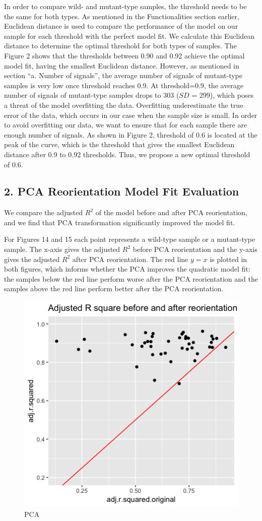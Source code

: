 \documentclass[10pt,letterpaper]{article}
\begin{document}
In order to compare wild- and mutant-type samples, the threshold needs
to be the same for both types. As mentioned in the Functionalities
section earlier, Euclidean distance is used to compare the performance
of the model on our sample for each threshold with the perfect model
fit. We calculate this Euclidean distance to determine the optimal
threshold for both types of samples. The Figure 2 shows that the
thresholds between 0.90 and 0.92 achieve the optimal model fit, having
the smallest Euclidean distance. However, as mentioned in section ``a.
Number of signals'', the average number of signals of mutant-type
samples is very low once threshold reaches 0.9. At threshold=0.9, the
average number of signals of mutant-type samples drops to 303 (\(SD\) =
299), which poses a threat of the model overfitting the data.
Overfitting underestimate the true error of the data, which occurs in
our case when the sample size is small. In order to avoid overfitting
our data, we want to ensure that for each sample there are enough number
of signals. As shown in Figure 2, threshold of 0.6 is located at the
peak of the curve, which is the threshold that gives the smallest
Euclidean distance after 0.9 to 0.92 thresholds. Thus, we propose a new
optimal threshold of 0.6.

\hypertarget{pca-reorientation-model-fit-evaluation}{%
\subsection{2. PCA Reorientation Model Fit
Evaluation}\label{pca-reorientation-model-fit-evaluation}}

We compare the adjusted \(R^2\) of the model before and after PCA
reorientation, and we find that PCA transformation significantly
improved the model fit.

For Figures 14 and 15 each point represents a wild-type sample or a
mutant-type sample. The x-axis gives the adjusted \(R^2\) before PCA
reorientation and the y-axis gives the adjusted \(R^2\) after PCA
reorientation. The red line \(y=x\) is plotted in both figures, which
informs whether the PCA improves the quadratic model fit: the samples
below the red line perform worse after the PCA reorientation and the
samples above the red line perform better after the PCA reorientation.

\begin{figure}[H]
\includegraphics[width=0.6\linewidth]{visualization_paper/adj_r2_before_after_wt} \caption{PCA }\label{fig:Figure14}
\end{figure}
\end{document}
